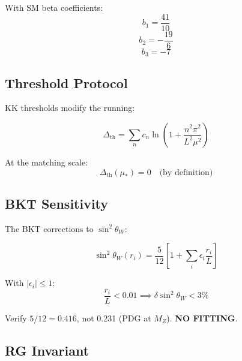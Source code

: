 \documentclass[11pt,a4paper]{article}
\begin{document}
With SM beta coefficients:
\begin{equation}
\label{eq:beta-b1}
b_1 = \frac{41}{10}
\end{equation}
\begin{equation}
\label{eq:beta-b2}
b_2 = -\frac{19}{6}
\end{equation}
\begin{equation}
\label{eq:beta-b3}
b_3 = -7
\end{equation}

\subsection{Threshold Protocol}
\label{subsec:threshold}

KK thresholds modify the running:

\begin{equation}
\label{eq:threshold-correction}
\Delta_{\text{th}} = \sum_n c_n \ln\left(1 + \frac{n^2\pi^2}{L^2\mu^2}\right)
\end{equation}

At the matching scale:
\begin{equation}
\label{eq:threshold-at-mustar}
\Delta_{\text{th}}(\mu_*) = 0 \quad \text{(by definition)}
\end{equation}

\subsection{BKT Sensitivity}
\label{subsec:bkt-weinberg}

The BKT corrections to $\sin^2\theta_W$:

\begin{equation}
\label{eq:bkt-sin2}
\sin^2\theta_W(r_i) = \frac{5}{12}\left[1 + \sum_i \epsilon_i \frac{r_i}{L}\right]
\end{equation}

With $|\epsilon_i| \leq 1$:
\begin{equation}
\label{eq:bkt-bound-sin2}
\frac{r_i}{L} < 0.01 \implies \delta\sin^2\theta_W < 3\%
\end{equation}

\begin{trapbox}
\label{trap:rt09}
Verify $5/12 = 0.41\overline{6}$, not 0.231 (PDG at $M_Z$). \textbf{NO FITTING}.
\end{trapbox}

\subsection{RG Invariant}
\label{subsec:rg-invariant}
\end{document}
